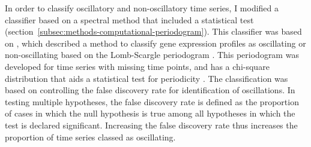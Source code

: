 In order to classify oscillatory and non-oscillatory time series, I modified a classifier based on a spectral method that included a statistical test (section~\ref{subsec:methods-computational-periodogram}).
This classifier was based on \textcite{glynnDetectingPeriodicPatterns2006a}, which described a method to classify gene expression profiles as oscillating or non-oscillating based on the Lomb-Scargle periodogram \parencite{lombLeastsquaresFrequencyAnalysis1976}.
This periodogram was developed for time series with missing time points, and has a chi-square distribution that aids a statistical test for periodicity \parencite{scargleStudiesAstronomicalTime1982}.
The classification was based on controlling the false discovery rate for identification of oscillations.
In testing multiple hypotheses, the false discovery rate is defined as the proportion of cases in which the null hypothesis is true among all hypotheses in which the test is declared significant.
Increasing the false discovery rate thus increases the proportion of time series classed as oscillating.

